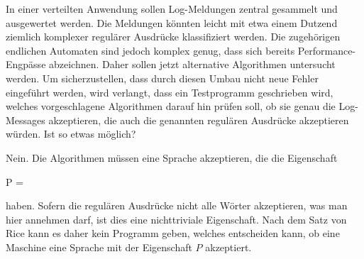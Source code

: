 In einer verteilten Anwendung sollen Log-Meldungen zentral gesammelt
und ausgewertet werden.
Die Meldungen könnten leicht mit etwa einem Dutzend ziemlich
komplexer regulärer Ausdrücke klassifiziert werden.
Die zugehörigen endlichen Automaten sind jedoch komplex genug, dass
sich bereits Performance-Engpässe abzeichnen.
Daher sollen jetzt alternative Algorithmen untersucht werden.
Um sicherzustellen, dass durch diesen Umbau nicht neue Fehler
eingeführt werden, wird verlangt, dass ein Testprogramm geschrieben
wird, welches vorgeschlagene Algorithmen darauf hin prüfen soll,
ob sie genau die Log-Messages akzeptieren, die auch die genannten
regulären Ausdrücke akzeptieren würden.
Ist so etwas möglich?


\begin{loesung}
Nein.
Die Algorithmen müssen eine Sprache akzeptieren, die die Eigenschaft
\begin{center}
P = 
\end{center}
haben.
Sofern die regulären Ausdrücke nicht alle Wörter akzeptieren, was man
hier annehmen darf, ist dies eine nichttriviale Eigenschaft.
Nach dem Satz von Rice kann es daher kein Programm geben, welches
entscheiden kann, ob eine Maschine eine Sprache mit der Eigenschaft
$P$ akzeptiert.
\end{loesung}






